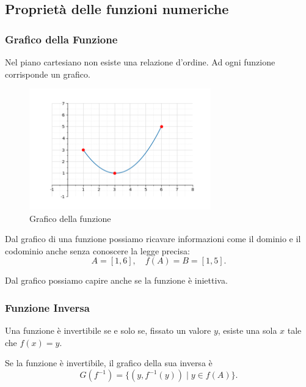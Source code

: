 \documentclass[oneside,10pt]{book} %
\begin{document}
\subsection{Proprietà delle funzioni numeriche}
\subsubsection{Grafico della Funzione}


Nel piano cartesiano non esiste una relazione d'ordine.
Ad ogni funzione corrisponde un grafico.

\begin{figure}[h]
    \centering
    \includegraphics[width=0.7\textwidth]{./img/grafico.png} %
    \caption{Grafico della funzione}
    \label{fig:grafico_della_funzione}
  \end{figure}
  
Dal grafico di una funzione possiamo ricavare informazioni come il dominio e il codominio anche senza conoscere la legge precisa:
\[
A = [1, 6], \quad f(A) = B = [1, 5].
\]

Dal grafico possiamo capire anche se la funzione è iniettiva.

\subsubsection{Funzione Inversa}

Una funzione è invertibile se e solo se, fissato un valore $y$, esiste una sola $x$ tale che $f(x) = y$.

Se la funzione è invertibile, il grafico della sua inversa è
\[
G(f^{-1}) = \{(y, f^{-1}(y)) \mid y \in f(A)\}.
\]
\end{document}
